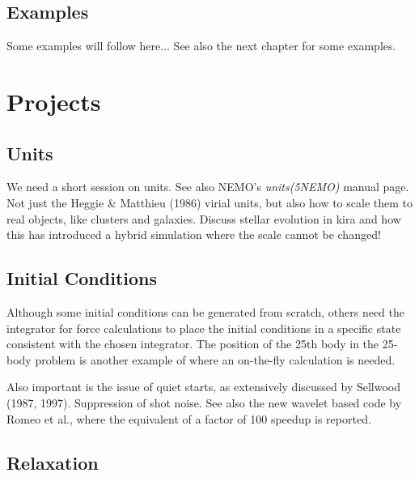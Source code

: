 \begin{center}
\begin{table}[h!]
\begin{tabular}{||l|l|l|l|l|l||}
\hline 




\end{tabular}
\end{table}
\end{center}

\section{Examples}

Some examples will follow here... See also the next chapter for some examples.



\chapter                {Projects}

\section{Units}

We need a short session on units. See also NEMO's {\it units(5NEMO)} manual page.
Not just the Heggie \& Matthieu (1986) virial units, but also how to scale them to
real objects, like clusters and galaxies. Discuss stellar evolution in kira
and how this has introduced a hybrid simulation where the scale cannot be
changed!

\section{Initial Conditions}

Although some initial conditions can be generated from scratch, others need the
integrator for force calculations to place the initial conditions in a
specific state consistent with the chosen integrator. The position of the 25th
body in the 25-body problem is another example of where an on-the-fly calculation
is needed.

Also important is the issue of quiet starts, as extensively
discussed by Sellwood (1987, 1997). Suppression of shot noise.
See also the new wavelet based code by Romeo et al., where the
equivalent of a factor of 100 speedup is reported.

\section{Relaxation}


